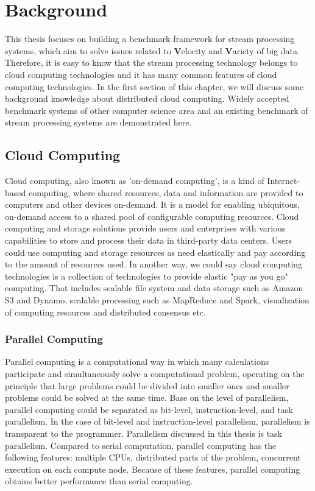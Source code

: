 \chapter{Background}
This thesis focuses on building a benchmark framework for stream processing systems, which aim to solve issues related to \textbf{V}elocity and \textbf{V}ariety of big data. \cite{GameChanger} Therefore, it is easy to know that the stream processing technology belongs to cloud computing technologies and it has many common features of cloud computing technologies. In the first section of this chapter, we will discuss some background knowledge about distributed cloud computing.   Widely accepted benchmark systems of other computer science area and an existing benchmark of stream processing systems are demonstrated here. 

\section{Cloud Computing}
Cloud computing, also known as 'on-demand computing', is a kind of Internet-based computing, where shared resources, data and information are provided to computers and other devices on-demand. It is a model for enabling ubiquitous, on-demand access to a shared pool of configurable computing resources. \cite{neto2011demystifying, mell2011nist} Cloud computing and storage solutions provide users and enterprises with various capabilities to store and process their data in third-party data centers. \cite{haghighat2015cloudid} Users could use computing and storage resources as need elastically and pay according to the amount of resources used. In another way, we could say cloud computing technologies is a collection of technologies to provide elastic "pay as you go" computing. That includes scalable file system and data storage such as Amazon S3 and Dynamo, scalable processing such as MapReduce and Spark, visualization of computing resources and distributed consensus etc. 

\subsection{Parallel Computing}

Parallel computing is a computational way in which many calculations participate and simultaneously solve a computational problem, operating on the principle that large problems could be divided into smaller ones and smaller problems could be solved at the same time. Base on the level of parallelism, parallel computing could be separated as bit-level, instruction-level,  and task parallelism. In the case of bit-level and instruction-level parallelism, parallelism is transparent to the programmer. Parallelism discussed in this thesis is task parallelism. Compared to serial computation, parallel computing has the following features: multiple CPUs, distributed parts of the problem, concurrent execution on each compute node. Because of these features, parallel computing obtains better performance than serial computing. 


